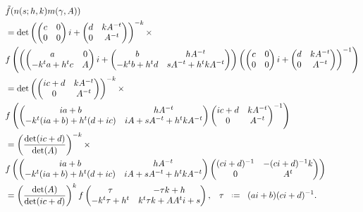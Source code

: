 \begin{align*}
	&\tilde{f}(n(s; h, k) m(\gamma, A) ) \\
	 &= \det\left(\begin{pmatrix}
		c & 0 \\
		0 & 0
	\end{pmatrix}i+ \begin{pmatrix}
		d & kA^{-t} \\
		0 & A^{-t}
	\end{pmatrix} \right)^{-k} \times \\
	&f\left(         \left(\begin{pmatrix}
		a & 0\\
		-k^ta + h^tc & A
	\end{pmatrix}i+\begin{pmatrix}
		b & hA^{-t} \\
		-k^tb + h^td & sA^{-t} + h^tkA^{-t}
	\end{pmatrix}\right)   \left(\begin{pmatrix}
		c & 0 \\
		0 & 0
	\end{pmatrix}i+ \begin{pmatrix}
		d & kA^{-t} \\
		0 & A^{-t}
	\end{pmatrix} \right)\inv      \right) \\
	&= \det\left( \begin{pmatrix}
		ic + d & kA^{-t} \\
		0 & A^{-t}
	\end{pmatrix}\right)^{-k} \times \\
	&f\left( \begin{pmatrix}
		ia + b &  hA^{-t}\\
		-k^t(ia +b) + h^t(d + ic) & iA + sA^{-t} + h^tkA^{-t}
	\end{pmatrix}  \begin{pmatrix}
		ic + d & kA^{-t} \\
		0 & A^{-t}
	\end{pmatrix}\inv      \right) \\
	&=\left(\frac{\det(ic + d)}{\det(A)}\right)^{-k} \times \\ &f\left( \begin{pmatrix}
		ia + b &  hA^{-t}\\
		-k^t(ia +b) + h^t(d + ic) & iA + sA^{-t} + h^tkA^{-t}
	\end{pmatrix}   \begin{pmatrix}(ci+d)^{-1} & -(ci+d)^{-1} k\\ 0 & A^t \end{pmatrix} \right) \\
	&= \left(\frac{\det(A)}{\det(ic + d)}\right)^{k} f\begin{pmatrix} \tau & -\tau k + h\\ -k^t \tau + h^t & k^t \tau k + A A^t i + s \end{pmatrix}, \;\;\; \tau \defeq (ai+b)(ci + d)\inv .\\
\end{align*} 
